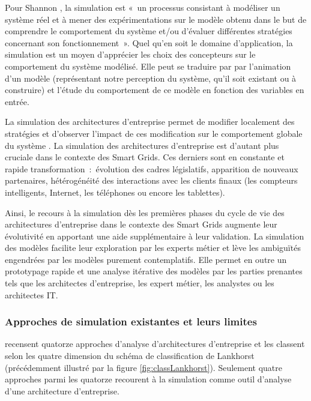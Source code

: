 Pour Shannon \cite{shannon1975systems}, la simulation est «~un processus
consistant à modéliser un système réel et à mener des expérimentations sur le
modèle obtenu dans le but de comprendre le comportement du système et/ou
d'évaluer différentes stratégies concernant son fonctionnement~».  Quel qu'en
soit le domaine d'application, la simulation est un moyen d'apprécier les choix
des concepteurs sur le comportement du système modélisé. Elle peut se traduire par
par l'animation d'un modèle (représentant notre perception du système,
qu'il soit existant ou à construire) et l'étude du comportement de ce modèle en
fonction des variables en entrée. 

La simulation des architectures d'entreprise permet de modifier localement des stratégies
et d'observer l'impact de ces modification sur le comportement globale du système \cite{buckl2008towards}. La simulation des architectures d'entreprise est d'autant plus cruciale dans le contexte des Smart Grids. Ces derniers sont en constante et rapide transformation~:~évolution des cadres législatifs, apparition de nouveaux partenaires, hétérogénéité des interactions avec les clients finaux (les compteurs intelligents, Internet, les téléphones ou encore les tablettes). 

Ainsi, le recours à la simulation dès les premières phases du cycle de vie des
architectures d'entreprise dans le contexte des Smart Grids augmente leur évolutivité en apportant une aide supplémentaire à leur validation. La simulation des modèles facilite leur exploration par les experts métier et lève les ambiguïtés engendrées par les
modèles purement contemplatifs. Elle permet en outre un prototypage rapide et
une analyse itérative des modèles par les parties prenantes tels que les
architectes d'entreprise, les expert métier, les analystes ou les architectes
IT. 

\subsubsection{Approches de simulation existantes et leurs limites}

\cite{manzur2015xarchimate} recensent quatorze approches d'analyse
d'architectures d'entreprise et les classent selon les quatre dimension du
schéma de classification de Lankhorst \cite{lankhorst2013enterprise} (précédemment illustré par la figure
\ref{fig:classLankhorst}). Seulement quatre approches parmi les quatorze
recourent à la simulation comme outil d'analyse d'une architecture
d'entreprise.

